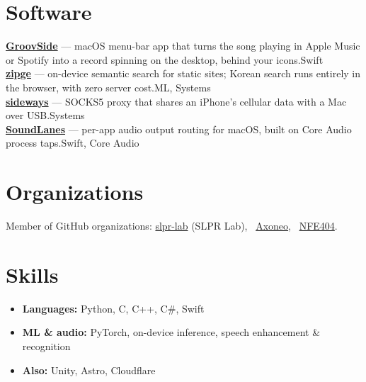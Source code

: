 \documentclass[10pt,a4paper]{article}
\begin{document}
\section{Software}
\textbf{\href{https://zinu.kim/groovside}{GroovSide}} — macOS menu-bar app that turns the song playing in Apple Music or Spotify into a record spinning on the desktop, behind your icons.\hfill{\color{muted}Swift}\\[4pt]
\textbf{\href{https://github.com/soysaucecrab/zipge}{zipge}} — on-device semantic search for static sites; Korean search runs entirely in the browser, with zero server cost.\hfill{\color{muted}ML, Systems}\\[4pt]
\textbf{\href{https://github.com/soysaucecrab/sideways}{sideways}} — SOCKS5 proxy that shares an iPhone's cellular data with a Mac over USB.\hfill{\color{muted}Systems}\\[4pt]
\textbf{\href{https://github.com/soysaucecrab/SoundLanes}{SoundLanes}} — per-app audio output routing for macOS, built on Core Audio process taps.\hfill{\color{muted}Swift, Core Audio}

\section{Organizations}
Member of GitHub organizations:
\href{https://github.com/slpr-lab}{slpr-lab} (SLPR Lab),\ %
\href{https://github.com/Axoneo}{Axoneo},\ %
\href{https://github.com/NFE404}{NFE404}.

\section{Skills}
\begin{itemize}[leftmargin=1.1em,itemsep=2pt,topsep=4pt]
  \item \textbf{Languages:} Python, C, C++, C\#, Swift
  \item \textbf{ML \& audio:} PyTorch, on-device inference, speech enhancement \& recognition
  \item \textbf{Also:} Unity, Astro, Cloudflare
\end{itemize}
\end{document}
